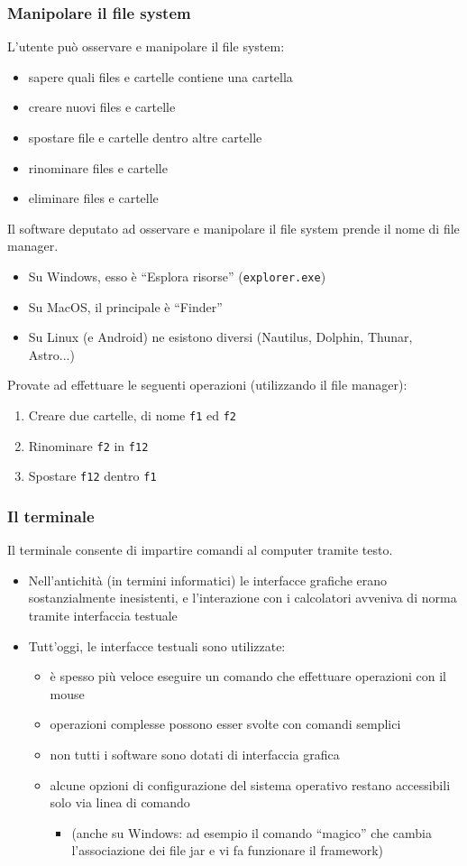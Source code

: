 \documentclass{beamer}
\begin{document}
\begin{frame}[fragile]
\frametitle{Manipolare il file system}
L'utente può osservare e manipolare il file system:
\begin{itemize}
 \item sapere quali files e cartelle contiene una cartella
 \item creare nuovi files e cartelle
 \item spostare file e cartelle dentro altre cartelle
 \item rinominare files e cartelle
 \item eliminare files e cartelle
\end{itemize}
Il software deputato ad osservare e manipolare il file system prende il nome di file manager.
\begin{itemize}
 \item Su Windows, esso è ``Esplora risorse'' (\texttt{explorer.exe})
 \item Su MacOS, il principale è ``Finder''
 \item Su Linux (e Android) ne esistono diversi (Nautilus, Dolphin, Thunar, Astro...)
\end{itemize}
Provate ad effettuare le seguenti operazioni (utilizzando il file manager):
\begin{enumerate}
 \item Creare due cartelle, di nome \texttt{f1} ed \texttt{f2}
 \item Rinominare \texttt{f2} in \texttt{f12}
 \item Spostare \texttt{f12} dentro \texttt{f1}
\end{enumerate}
\end{frame}

\begin{frame}[fragile]
\frametitle{Il terminale}
Il terminale consente di impartire comandi al computer tramite testo.
\begin{itemize}
 \item Nell'antichità (in termini informatici) le interfacce grafiche erano sostanzialmente inesistenti, e l'interazione con i calcolatori avveniva di norma tramite interfaccia testuale
 \item Tutt'oggi, le interfacce testuali sono utilizzate:
\begin{itemize}
 \item è spesso più veloce eseguire un comando che effettuare operazioni con il mouse
 \item operazioni complesse possono esser svolte con comandi semplici
 \item non tutti i software sono dotati di interfaccia grafica
 \item alcune opzioni di configurazione del sistema operativo restano accessibili solo via linea di comando
\begin{itemize}
 \item (anche su Windows: ad esempio il comando ``magico'' che cambia l'associazione dei file jar e vi fa funzionare il framework)
\end{itemize}
\end{itemize}
\end{itemize}
\end{frame}
\end{document}
